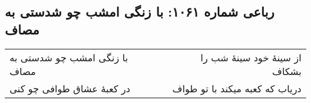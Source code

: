 \begin{center}
\section*{رباعی شماره ۱۰۶۱: با زنگی امشب چو شدستی به مصاف}
\label{sec:1061}
\begin{longtable}{l p{0.5cm} r}
با زنگی امشب چو شدستی به مصاف
&&
از سینهٔ خود سینهٔ شب را بشکاف
\\
در کعبهٔ عشاق طوافی چو کنی
&&
دریاب که کعبه میکند با تو طواف
\\
\end{longtable}
\end{center}
